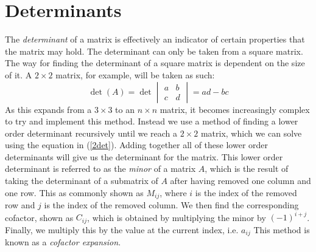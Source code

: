\section{Determinants}
The \emph{determinant} of a matrix is effectively an indicator of certain
properties that the matrix may hold. The determinant can only be taken from a
square matrix. The way for finding the determinant of a square matrix is
dependent on the size of it. A $2\times 2$ matrix, for example, will be taken as
such:
\begin{equation}\label{2det}
    \det{(A)} = 
    \det
    \begin{vmatrix}
        a & b \\
        c & d
    \end{vmatrix}
    = ad - bc
\end{equation}
As this expands from a $3 \times 3$ to an $n \times n$ matrix, it becomes
increasingly complex to try and implement this method. Instead we use a method
of finding a lower order determinant recursively until we reach a $2 \times 2$
matrix, which we can solve using the equation in (\ref{2det}). Adding together
all of these lower order determinants will give us the determinant for the
matrix. This lower order determinant is referred to as the \emph{minor} of a
matrix $A$, which is the result of taking the determinant of a submatrix of $A$
after having removed one column and one row. This as commonly shown as $M_{ij}$,
where $i$ is the index of the removed row and $j$ is the index of the removed
column. We then find the corresponding cofactor, shown as $C_{ij}$,
which is obtained by multiplying the minor by $(-1)^{i+j}$. Finally, we multiply
this by the value at the current index, i.e. $a_{ij}$ This method
is known
as
a \emph{cofactor expansion}.


